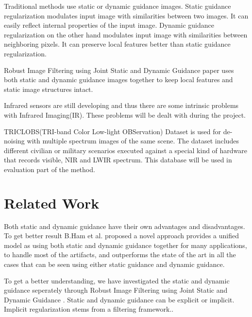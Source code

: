 \documentclass[10pt,twocolumn,letterpaper]{article}
\begin{document}
Traditional methods use static or dynamic guidance images. Static guidance regularization modulates input image with similarities between two images. It can easily reflect internal properties of the input image.
Dynamic guidance regularization on the other hand modulates input image with similarities between neighboring pixels. It can preserve local features better than static guidance regularization.

Robust Image Filtering using Joint Static and Dynamic Guidance\cite{ham2015} paper uses both static and dynamic guidance images together to keep local features and static image structures intact.

Infrared sensors are still developing and thus there are some intrinsic problems with Infrared Imaging(IR). These problems will be dealt with during the project.

TRICLOBS(TRI-band Color Low-light OBServation) Dataset\cite{triclobs} is used for de-noising with multiple spectrum images of the same scene. The dataset includes different civilian or military scenarios executed against a special kind of hardware that records visible, NIR and LWIR spectrum. This database will be used in evaluation part of the method\cite{ham2015}.

\section{Related Work}

Both static and dynamic guidance have their own advantages and disadvantages. To get better result B.Ham et al.\cite{ham2015} proposed a novel approach provides a unified model as using both static and dynamic guidance together for many applications, to handle most of the artifacts, and outperforms the state of the art in all the cases that can be seen using either static guidance and dynamic guidance.

To get a better understanding, we have investigated the static and dynamic guidance seperately through Robust Image Filtering using Joint Static and Dynamic
Guidance\cite{ham2015} . Static and dynamic guidance can be explicit or implicit. Implicit regularization stems from a filtering framework.\cite{ham2015}. 
\end{document}
